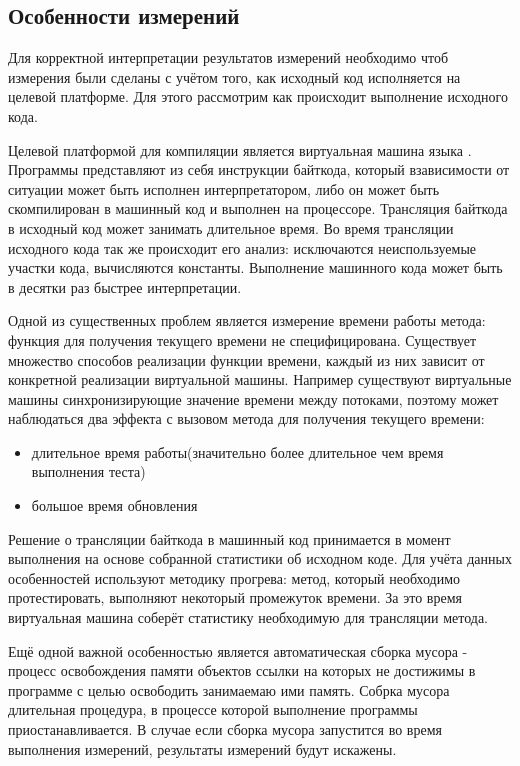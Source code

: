 \subsection{Особенности измерений}
Для корректной интерпретации результатов измерений необходимо чтоб измерения были сделаны с учётом того, как исходный код исполняется на целевой платформе. Для этого рассмотрим как происходит выполнение исходного кода.

Целевой платформой для компиляции является виртуальная машина языка . Программы представляют из себя инструкции байткода, который взависимости от ситуации может быть исполнен интерпретатором, либо он может быть скомпилирован в машинный код и выполнен на процессоре. Трансляция байткода в исходный код может занимать длительное время. Во время трансляции исходного кода так же происходит его анализ: исключаются неиспользуемые участки кода, вычисляются константы. Выполнение машинного кода может быть в десятки раз быстрее интерпретации.

Одной из существенных проблем является измерение времени работы метода: функция для получения текущего времени не специфицирована. Существует множество способов реализации функции времени, каждый из них зависит от конкретной реализации виртуальной машины. Например существуют виртуальные машины синхронизирующие значение времени между потоками, поэтому может наблюдаться два эффекта с вызовом метода для получения текущего времени:
\begin{itemize}
  \item длительное время работы(значительно более длительное чем время выполнения теста)
  \item большое время обновления
\end{itemize}

Решение о трансляции байткода в машинный код принимается в момент выполнения на основе собранной статистики об исходном коде. Для учёта данных особенностей используют методику прогрева: метод, который необходимо протестировать, выполняют некоторый промежуток времени. За это время виртуальная машина соберёт статистику необходимую для трансляции метода.

Ещё одной важной особенностью является автоматическая сборка мусора - процесс освобождения памяти объектов ссылки на которых не достижимы в программе с целью освободить занимаемаю ими память. Собрка мусора длительная процедура, в процессе которой выполнение программы приостанавливается. В случае если сборка мусора запустится во время выполнения измерений, результаты измерений будут искажены.

